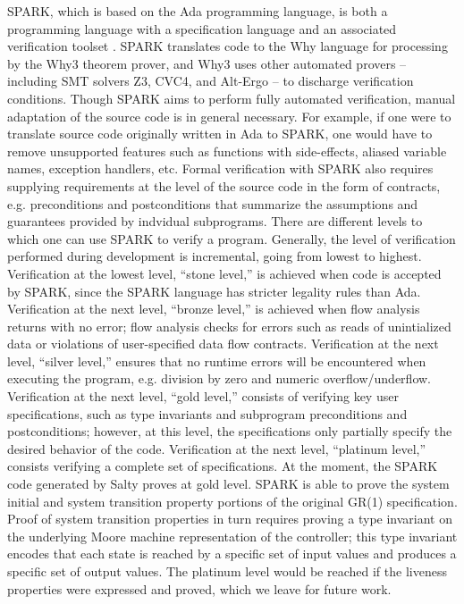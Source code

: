 \documentclass[runningheads]{llncs}
\begin{document}
SPARK, which is based on the Ada programming language, is both a programming language 
with a specification language and an associated verification toolset \cite{hoang2015spark}.
SPARK translates code to the Why language for processing by the Why3 theorem prover, 
and Why3 uses other automated provers -- including SMT solvers Z3, CVC4, and Alt-Ergo -- to discharge verification conditions.
Though SPARK aims to perform fully automated verification, manual adaptation of the source code is in general necessary. 
For example, if one were to translate source code originally written in Ada to SPARK, 
one would have to remove unsupported features such as functions with side-effects, aliased variable names, exception handlers, etc.  
Formal verification with SPARK also requires supplying requirements at the level of the source code in the 
form of contracts, e.g. preconditions and postconditions that summarize the assumptions and guarantees provided by indvidual subprograms.
There are different levels to which one can use SPARK to verify a program. 
Generally, the level of verification performed during development is incremental, going from lowest to highest. 
Verification at the lowest level, ``stone level,'' is achieved when code is accepted by SPARK, 
since the SPARK language has stricter legality rules than Ada. 
Verification at the next level, ``bronze level,'' is achieved when flow analysis returns with no error; 
flow analysis checks for errors such as reads of unintialized data or violations of user-specified data flow contracts. 
Verification at the next level, ``silver level,'' ensures that no runtime errors will be encountered when executing the program, 
e.g. division by zero and numeric overflow/underflow. 
Verification at the next level, ``gold level,''  consists of verifying key user specifications, such as 
type invariants and subprogram preconditions and postconditions; 
however, at this level, the specifications only partially specify the desired behavior of the code.  
Verification at the next level, ``platinum level,'' consists verifying a complete set of specifications.
At the moment, the SPARK code generated by Salty proves at gold level.  
SPARK is able to prove the system initial and system transition property portions of the original GR(1) specification. 
Proof of system transition properties in turn requires proving a type invariant on the underlying Moore machine representation of the controller; 
this type invariant encodes that each state is reached by a specific set of input values and produces a specific set of output values. 
The platinum level would be reached if the liveness properties were expressed and proved, 
which we leave for future work.
\end{document}
